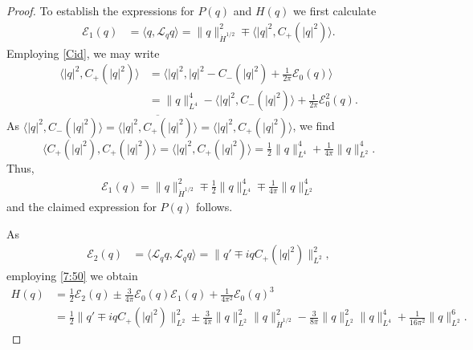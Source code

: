 \documentclass[10pt,a4paper]{amsart}
\newcommand{\Lc}{\mathcal{L}}
\newcommand{\lan}{\langle}
\newcommand{\ran}{\rangle}
\begin{document}
\begin{proof}
To establish the expressions for $P(q)$ and $H(q)$ we first calculate
\begin{align*}
\mathcal{E}_1(q)&=\lan q,\Lc_qq\ran=\|q\|_{\dot{H}^{1/2}}^2\mp\lan |q|^2, C_+(|q|^2)\ran.
\end{align*}
Employing \eqref{Cid}, we may write
\begin{align*}
\lan |q|^2, C_+(|q|^2)\ran&=\lan |q|^2,|q|^2-C_-(|q|^2)+\tfrac1{2\pi}\mathcal{E}_0(q)\ran\\
&=\|q\|_{L^4}^4-\lan |q|^2,C_-(|q|^2)\ran+\tfrac1{2\pi}\mathcal{E}_0^2(q).
\end{align*}
As $\lan |q|^2,C_-(|q|^2)\ran=\overline{\lan |q|^2,C_+(|q|^2)\ran}=\lan |q|^2,C_+(|q|^2)\ran$, we find
\begin{equation}\label{eqn:norm_Cp_q^2}
\lan C_+ (|q|^2),C_+(|q|^2)\ran=\lan |q|^2,C_+(|q|^2)\ran=\tfrac12\|q\|_{L^4}^4+\tfrac1{4\pi}\|q\|_{L^2}^4.
\end{equation}
Thus,
\begin{align}\label{7:50}
\mathcal{E}_1(q)=\|q\|_{\dot{H}^{1/2}}^2\mp\tfrac12\|q\|_{L^4}^4\mp\tfrac1{4\pi}\|q\|_{L^2}^4
\end{align}
and the claimed expression for $P(q)$ follows.

As 
\begin{align}\label{5:08}
\mathcal{E}_2(q)&=\lan \Lc_qq,\Lc_qq\ran=\|q'\mp i qC_+(|q|^2)\|_{L^2}^2,
\end{align}
employing \eqref{7:50} we obtain
\begin{align*}
H(q)&=\tfrac12\mathcal{E}_2(q)\pm\tfrac{3}{4\pi}\mathcal{E}_0(q)\mathcal{E}_1(q)+\tfrac{1}{4\pi^2}\mathcal{E}_0(q)^3\\
&=\tfrac12\|q'\mp i qC_+(|q|^2)\|_{L^2}^2\pm \tfrac{3}{4\pi} \|q\|_{L^2}^2\|q\|_{\dot{H}^{1/2}}^2-\tfrac{3}{8\pi}\|q\|_{L^2}^2\|q\|_{L^4}^4+\tfrac{1}{16\pi^2}\|q\|_{L^2}^6.
\end{align*}


\end{proof}
\end{document}
